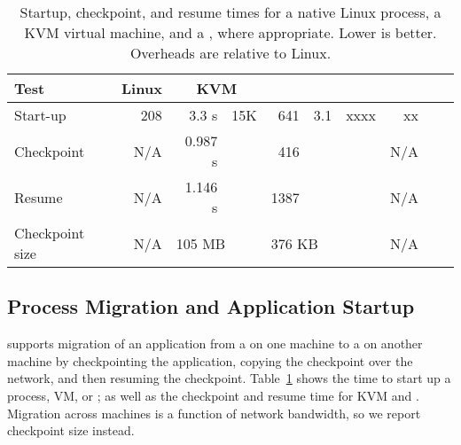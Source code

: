 

\begin{table}[t!b!]
\footnotesize
\centering
\begin{tabular}{|l|r|rr|rr|rr|rr|}
\hline
{\bf Test } & {\bf Linux } & \multicolumn{2}{c|}{{\bf KVM}}
& \multicolumn{2}{c|}{{\bf \sysname{}}} & \multicolumn{2}{c|}{{\bf \graphenesgx{}}}\\
\hline

Start-up   & 208 \us{} & 3.3 s & 15K\x{} & 641 \us{} & 3.1\x{} & xxxx \us{} & xx\x{} \\
\hline
Checkpoint & N/A   & 0.987 s  &  &   416 \us{} & & & N/A \\
\hline
Resume     & N/A   & 1.146 s  &  &  1387 \us{} & & & N/A \\
\hline\hline
Checkpoint size & N/A & \multicolumn{2}{l|}{105 MB} & \multicolumn{2}{l|}{376 KB}  &  & N/A  \\
\hline
\end{tabular}
\caption[Startup, checkpoint, and resume times in Linux, KVM and \sysname{}]
{Startup, checkpoint, and resume times for a native Linux process,
a KVM virtual machine,
and a \sysname{} \picoproc{}, where appropriate. Lower is better.  
Overheads are relative to Linux. } 
\label{tab:graphene:startup}
\end{table}

\subsection{Process Migration and Application Startup}

\sysname{} supports migration of an application from a \picoproc{} on one machine
to a \picoproc{} on another machine by checkpointing the application,
copying the checkpoint over the network, and then resuming the checkpoint.
Table~\ref{tab:graphene:startup} shows the time to start
up a process, VM, or \picoproc{}; as well as the checkpoint and resume time for KVM and \sysname{}.
Migration across machines is a function of network bandwidth,
so we report checkpoint size instead. %


